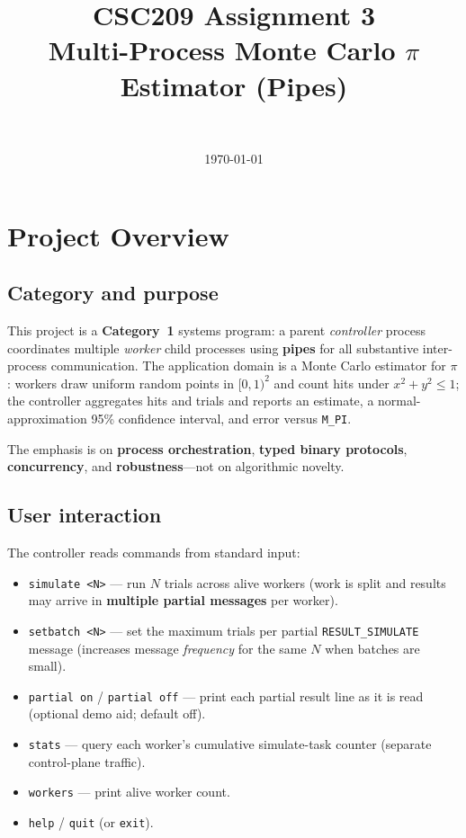 \documentclass[11pt]{article}
\title{CSC209 Assignment 3\\Multi-Process Monte Carlo $\pi$ Estimator (Pipes)}
\author{\teamname\\\members}
\date{\today}
\begin{document}
\maketitle

\section{Project Overview}
\label{sec:overview}

\subsection{Category and purpose}
This project is a \textbf{Category~1} systems program: a parent \emph{controller} process coordinates multiple \emph{worker} child processes using \textbf{pipes} for all substantive inter-process communication. The application domain is a Monte Carlo estimator for $\pi$: workers draw uniform random points in $[0,1)^2$ and count hits under $x^2+y^2\le 1$; the controller aggregates hits and trials and reports an estimate, a normal-approximation 95\% confidence interval, and error versus \texttt{M\_PI}.

The emphasis is on \textbf{process orchestration}, \textbf{typed binary protocols}, \textbf{concurrency}, and \textbf{robustness}---not on algorithmic novelty.

\subsection{User interaction}
The controller reads commands from standard input:
\begin{itemize}
  \item \texttt{simulate <N>} --- run $N$ trials across alive workers (work is split and results may arrive in \textbf{multiple partial messages} per worker).
  \item \texttt{setbatch <N>} --- set the maximum trials per partial \texttt{RESULT\_SIMULATE} message (increases message \emph{frequency} for the same $N$ when batches are small).
  \item \texttt{partial on} / \texttt{partial off} --- print each partial result line as it is read (optional demo aid; default off).
  \item \texttt{stats} --- query each worker's cumulative simulate-task counter (separate control-plane traffic).
  \item \texttt{workers} --- print alive worker count.
  \item \texttt{help} / \texttt{quit} (or \texttt{exit}).
\end{itemize}
\end{document}
